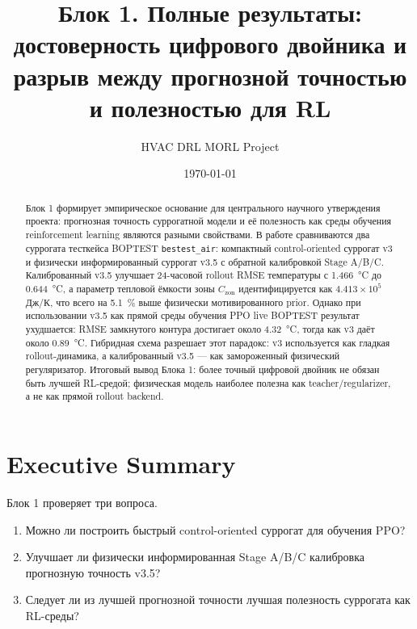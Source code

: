 \documentclass[12pt,a4paper]{article}
\title{Блок 1. Полные результаты: достоверность цифрового двойника и разрыв между прогнозной точностью и полезностью для RL}
\author{HVAC DRL MORL Project}
\date{\today}
\begin{document}
\maketitle

\begin{abstract}
Блок 1 формирует эмпирическое основание для центрального научного утверждения проекта: прогнозная точность суррогатной модели и её полезность как среды обучения reinforcement learning являются разными свойствами. В работе сравниваются два суррогата тесткейса BOPTEST \texttt{bestest\_air}: компактный control-oriented суррогат v3 и физически информированный суррогат v3.5 с обратной калибровкой Stage A/B/C. Калиброванный v3.5 улучшает 24-часовой rollout RMSE температуры с \SI{1.466}{\celsius} до \SI{0.644}{\celsius}, а параметр тепловой ёмкости зоны \(C_{\mathrm{zon}}\) идентифицируется как \(4.413\times 10^5\) Дж/К, что всего на \SI{5.1}{\percent} выше физически мотивированного prior. Однако при использовании v3.5 как прямой среды обучения PPO live BOPTEST результат ухудшается: RMSE замкнутого контура достигает около \SI{4.32}{\celsius}, тогда как v3 даёт около \SI{0.89}{\celsius}. Гибридная схема разрешает этот парадокс: v3 используется как гладкая rollout-динамика, а калиброванный v3.5 --- как замороженный физический регуляризатор. Итоговый вывод Блока 1: более точный цифровой двойник не обязан быть лучшей RL-средой; физическая модель наиболее полезна как teacher/regularizer, а не как прямой rollout backend.
\end{abstract}

\tableofcontents
\newpage

\section*{Executive Summary}

Блок 1 проверяет три вопроса.

\begin{enumerate}
    \item Можно ли построить быстрый control-oriented суррогат для обучения PPO?
    \item Улучшает ли физически информированная Stage A/B/C калибровка прогнозную точность v3.5?
    \item Следует ли из лучшей прогнозной точности лучшая полезность суррогата как RL-среды?
\end{enumerate}
\end{document}
